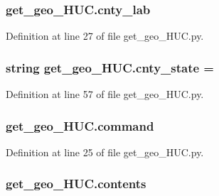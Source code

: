 \subsubsection[{\texorpdfstring{cnty\+\_\+lab}{cnty_lab}}]{\setlength{\rightskip}{0pt plus 5cm}get\+\_\+geo\+\_\+\+H\+U\+C.\+cnty\+\_\+lab}\hypertarget{namespaceget__geo___h_u_c_a49b3d33e0540c2e2f9e991370aae8f8e}{}\label{namespaceget__geo___h_u_c_a49b3d33e0540c2e2f9e991370aae8f8e}


Definition at line 27 of file get\+\_\+geo\+\_\+\+H\+U\+C.\+py.

\subsubsection[{\texorpdfstring{cnty\+\_\+state}{cnty_state}}]{\setlength{\rightskip}{0pt plus 5cm}string get\+\_\+geo\+\_\+\+H\+U\+C.\+cnty\+\_\+state = \textquotesingle{}\textquotesingle{}}\hypertarget{namespaceget__geo___h_u_c_a522c7169970f8e82ad010316aad9dfb2}{}\label{namespaceget__geo___h_u_c_a522c7169970f8e82ad010316aad9dfb2}


Definition at line 57 of file get\+\_\+geo\+\_\+\+H\+U\+C.\+py.

\subsubsection[{\texorpdfstring{command}{command}}]{\setlength{\rightskip}{0pt plus 5cm}get\+\_\+geo\+\_\+\+H\+U\+C.\+command}\hypertarget{namespaceget__geo___h_u_c_a8aad6d9263e79de308254e23bad82c50}{}\label{namespaceget__geo___h_u_c_a8aad6d9263e79de308254e23bad82c50}


Definition at line 25 of file get\+\_\+geo\+\_\+\+H\+U\+C.\+py.

\subsubsection[{\texorpdfstring{contents}{contents}}]{\setlength{\rightskip}{0pt plus 5cm}get\+\_\+geo\+\_\+\+H\+U\+C.\+contents}\hypertarget{namespaceget__geo___h_u_c_a64b97d57e591931c5f39709ac5d83dad}{}\label{namespaceget__geo___h_u_c_a64b97d57e591931c5f39709ac5d83dad}


